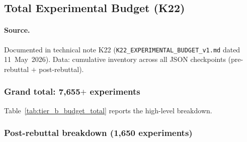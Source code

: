 \documentclass[conference]{IEEEtran}
\begin{document}
\subsection{Total Experimental Budget (K22)}
\label{sec:tier_b_budget}

\paragraph{Source.} Documented in technical note K22 (\texttt{K22\_EXPERIMENTAL\_BUDGET\_v1.md} dated 11~May~2026). Data: cumulative inventory across all JSON checkpoints (pre-rebuttal $+$ post-rebuttal).

\subsubsection*{Grand total: 7{,}655$+$ experiments}

Table~\ref{tab:tier_b_budget_total} reports the high-level breakdown.

\begin{table}[htbp]
\centering
\caption{Total experimental budget for the FL-EHDS framework, FLICS 2026 camera-ready (v12). Pre-rebuttal: paper-original submission (March 2026). Post-rebuttal: extensions for the major-revisions response, including the Tier~B+ core and the EXTRA / MORE / LAST batches documented in K9--K22.}
\label{tab:tier_b_budget_total}
\small
{}
\end{table}

\subsubsection*{Post-rebuttal breakdown (1{,}650 experiments)}
\end{document}
